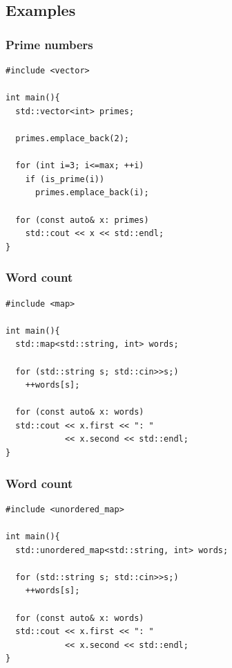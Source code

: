 \subsection{Examples}
\begin{frame}[fragile]
  \frametitle{Prime numbers}
\begin{lstlisting}
#include <vector>

int main(){
  std::vector<int> primes;
  
  primes.emplace_back(2);

  for (int i=3; i<=max; ++i)
    if (is_prime(i))
      primes.emplace_back(i);

  for (const auto& x: primes)
    std::cout << x << std::endl;
}
\end{lstlisting}
\end{frame}

\begin{frame}[fragile]
  \frametitle{Word count}
\begin{lstlisting}
#include <map>
  
int main(){
  std::map<std::string, int> words;
  
  for (std::string s; std::cin>>s;)
    ++words[s];

  for (const auto& x: words)
  std::cout << x.first << ": "
            << x.second << std::endl;
}
\end{lstlisting}
\end{frame}

\begin{frame}[fragile]
  \frametitle{Word count}
\begin{lstlisting}
#include <unordered_map>
  
int main(){
  std::unordered_map<std::string, int> words;
  
  for (std::string s; std::cin>>s;)
    ++words[s];

  for (const auto& x: words)
  std::cout << x.first << ": "
            << x.second << std::endl;
}
\end{lstlisting}
\end{frame}
